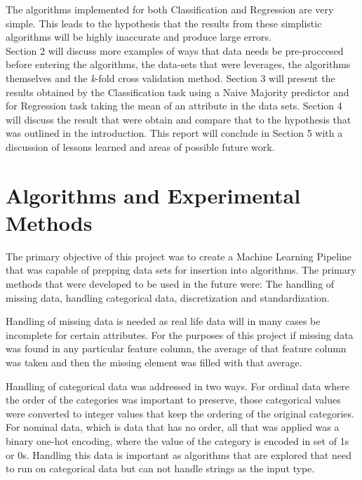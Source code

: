 \documentclass[twoside,11pt]{article}
\begin{document}
\hspace*{10mm} The algorithms implemented for both Classification and Regression are very simple. This leads to the hypothesis that the results from these simplistic algorithms will be highly inaccurate and produce large errors.\\
\hspace*{10mm} Section 2 will discuss more examples of ways that data needs be pre-proccesed before entering the algorithms, the data-sets that were leverages, the algorithms themselves and the \textit{k}-fold cross validation method. Section 3 will present the results obtained by the Classification task using a Naive Majority predictor and for Regression task taking the mean of an attribute in the data sets. Section 4 will discuss the result that were obtain and compare that to the hypothesis that was outlined in the introduction. This report will conclude in Section 5 with a discussion of lessons learned and areas of possible future work.\\

\newpage


\section{Algorithms and Experimental Methods}
The primary objective of this project was to create a Machine Learning Pipeline that was capable of prepping data sets for insertion into algorithms. The primary methods that were developed to be used in the future were: The handling of missing data, handling categorical data, discretization and standardization.\newline

Handling of missing data is needed as real life data will in many cases be incomplete for certain attributes. For the purposes of this project if missing data was found in any particular feature column, the average of that feature column was taken and then the missing element was filled with that average.\newline 

Handling of categorical data was addressed in two ways. For ordinal data where the order of the categories was important to preserve, those categorical values were converted to integer values that keep the ordering of the original categories. For nominal data, which is data that has no order, all that was applied was a binary one-hot encoding, where the value of the category is encoded in set of 1s or 0s. Handling this data is important as algorithms that are explored that need to run on categorical data but can not handle strings as the input type.\newline
\end{document}
